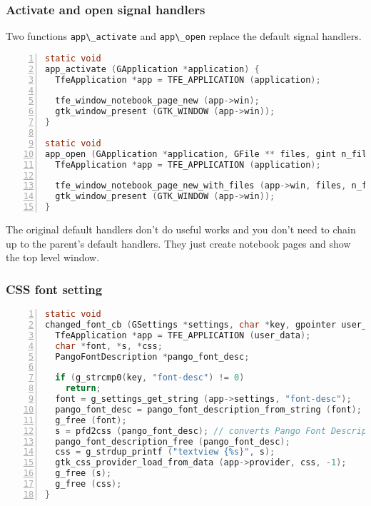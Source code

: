 \subsubsection{Activate and open signal
handlers}\label{activate-and-open-signal-handlers}

Two functions \passthrough{\lstinline!app\_activate!} and
\passthrough{\lstinline!app\_open!} replace the default signal handlers.

\begin{lstlisting}[language=C, numbers=left]
static void
app_activate (GApplication *application) {
  TfeApplication *app = TFE_APPLICATION (application);

  tfe_window_notebook_page_new (app->win);
  gtk_window_present (GTK_WINDOW (app->win));
}

static void
app_open (GApplication *application, GFile ** files, gint n_files, const gchar *hint) {
  TfeApplication *app = TFE_APPLICATION (application);

  tfe_window_notebook_page_new_with_files (app->win, files, n_files);
  gtk_window_present (GTK_WINDOW (app->win));
}
\end{lstlisting}

The original default handlers don't do useful works and you don't need
to chain up to the parent's default handlers. They just create notebook
pages and show the top level window.

\subsubsection{CSS font setting}\label{css-font-setting}

\begin{lstlisting}[language=C, numbers=left]
static void
changed_font_cb (GSettings *settings, char *key, gpointer user_data) {
  TfeApplication *app = TFE_APPLICATION (user_data);
  char *font, *s, *css;
  PangoFontDescription *pango_font_desc;

  if (g_strcmp0(key, "font-desc") != 0)
    return;
  font = g_settings_get_string (app->settings, "font-desc");
  pango_font_desc = pango_font_description_from_string (font);
  g_free (font);
  s = pfd2css (pango_font_desc); // converts Pango Font Description into CSS style string
  pango_font_description_free (pango_font_desc);
  css = g_strdup_printf ("textview {%s}", s);
  gtk_css_provider_load_from_data (app->provider, css, -1);
  g_free (s);
  g_free (css);
}
\end{lstlisting}

